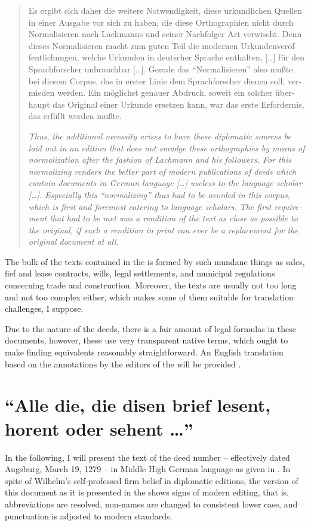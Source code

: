 \documentclass[12pt,paper=a4]{scrartcl}
\begin{document}
\foreignblockquote{german}{\begin{multicols}{2}Es ergibt sich daher die weitere 
Notwendigkeit, diese urkundlichen Quellen in einer Ausgabe vor sich zu haben, 
die diese Orthographien nicht durch Normalisieren nach Lachmanns und seiner 
Nachfolger Art verwischt. Denn dieses Normalisieren macht zum guten Teil die 
modernen Urkundenveröffentlichungen, welche Urkunden in deutscher Sprache 
ent\-halten, […] für den Sprachforscher un\-brauch\-bar […]. Gerade das 
\enquote{Normalisieren} also mußte bei diesem Corpus, das in erster Linie dem 
Sprachforscher dienen soll, vermieden werden. Ein möglichst genauer Abdruck, 
soweit ein solcher überhaupt das Original einer Urkunde ersetzen kann, war das 
erste Erfordernis, das erfüllt werden mußte. \autocite[LX]{CAO1}

\columnbreak

{\itshape Thus, the additional necessity arises to have these diplomatic sources 
be laid out in an edition that does not smudge these orthographies by means of 
normalization after the fashion of Lachmann and his followers. For this 
normalizing renders the better part of modern publications of deeds which 
contain documents in German language […] useless to the language scholar […]. 
Especially this \enquote{normalizing} thus had to be avoided in this corpus, 
which is first and foremost catering to language scholars. The first requirement 
that had to be met was a rendition of the text as close as possible to the 
original, if such a rendition in print can ever be a replacement for the 
original document at all.}\end{multicols}}

The bulk of the texts contained in the  is formed by such mundane 
things as sales, fief and lease contracts, wills, legal settlements, and 
municipal regulations concerning trade and construction. Moreover, the texts are 
usually not too long and not too complex either, which makes some of them 
suitable for translation challenges, I suppose.

Due to the nature of the deeds, there is a fair amount of legal formulas in 
these documents, however, these use very transparent native terms, which ought 
to make finding equivalents reasonably straightforward. An English translation 
based on the annotations by the editors of the  will be provided 
\autocite[see][]{n163-online}.

\section{\enquote{Alle die, die disen brief lesent, horent oder sehent …}}
In the following, I will present the text of the deed number 
 -- effectively dated Augsburg, March 19, 1279 -- in 
Middle High German language as given in \textcites{n163}{n163-online}. In spite 
of Wilhelm's self-professed firm belief in diplomatic editions, the version of 
this document as it is presented in the  shows signs of modern 
editing, that is, abbreviations are resolved, non-names are changed to 
consistent lower case, and punctuation is adjusted to modern standards.
\end{document}
